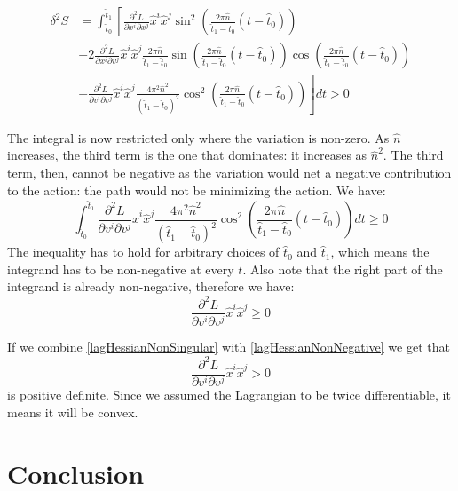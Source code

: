 \documentclass[aps,pra,10pt,floatfix,nofootinbib]{revtex4-1}
\theoremstyle{definition}
\begin{document}
\begin{align*}
\delta^2 S &= \int_{\hat{t}_0}^{\hat{t}_1} \left[ \frac{\partial^2 L}{\partial x^i\partial x^j} \hat{x}^i \hat{x}^j \sin^2\left(\frac{2\pi \hat{n}}{\hat{t}_1 - \hat{t}_0} (t-\hat{t}_0)\right) \right. \\
& + \left. 2 \frac{\partial^2 L}{\partial x^i\partial v^j} \hat{x}^i \hat{x}^j \frac{2\pi \hat{n}}{\hat{t}_1 - \hat{t}_0} \sin\left(\frac{2\pi \hat{n}}{\hat{t}_1 - \hat{t}_0} (t-\hat{t}_0)\right) \cos\left(\frac{2\pi \hat{n}}{\hat{t}_1 - \hat{t}_0} (t-\hat{t}_0)\right) \right. \\
& + \left.  \frac{\partial^2 L}{\partial v^i\partial v^j} \hat{x}^i \hat{x}^j \frac{4\pi^2 \hat{n}^2}{(\hat{t}_1 - \hat{t}_0)^2} \cos^2\left(\frac{2\pi \hat{n}}{\hat{t}_1 - \hat{t}_0} (t-\hat{t}_0)\right) \right]dt > 0
\end{align*}

The integral is now restricted only where the variation is non-zero. As $\hat{n}$ increases, the third term is the one that dominates: it increases as $\hat{n}^2$. The third term, then, cannot be negative as the variation would net a negative contribution to the action: the path would not be minimizing the action. We have:
\begin{equation}
\int_{\hat{t}_0}^{\hat{t}_1} \frac{\partial^2 L}{\partial v^i\partial v^j} \hat{x}^i \hat{x}^j \frac{4\pi^2 \hat{n}^2}{(\hat{t}_1 - \hat{t}_0)^2} \cos^2\left(\frac{2\pi \hat{n}}{\hat{t}_1 - \hat{t}_0} (t-\hat{t}_0)\right) dt \geq 0
\end{equation}
The inequality has to hold for arbitrary choices of $\hat{t}_0$ and $\hat{t}_1$, which means the integrand has to be non-negative at every $t$. Also note that the right part of the integrand is already non-negative, therefore we have:
\begin{equation}
\label{lagHessianNonNegative}
\frac{\partial^2 L}{\partial v^i\partial v^j} \hat{x}^i \hat{x}^j \geq 0
\end{equation}

If we combine \eqref{lagHessianNonSingular} with \eqref{lagHessianNonNegative} we get that
\begin{equation}
\label{lagHessianPositive}
\frac{\partial^2 L}{\partial v^i\partial v^j} \hat{x}^i \hat{x}^j > 0
\end{equation}
is positive definite. Since we assumed the Lagrangian to be twice differentiable, it means it will be convex.

\section{Conclusion}
\end{document}
